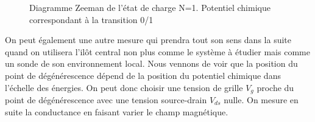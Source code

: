 \begin{figure}
\caption{Diagramme Zeeman de l'état de charge N=1. Potentiel chimique correspondant à la transition 0/1}
\label{charge_discharge}
\end{figure}

On peut également une autre mesure qui prendra tout son sens dans la suite quand on utilisera l'il\^ot central non plus comme le système à étudier mais comme un sonde de son environnement local. Nous vennons de voir que la position du point de dégénérescence dépend de la position du potentiel chimique dans l'échelle des énergies. On peut donc choisir une tension de grille $V_g$ proche du point de dégénérescence avec une tension source-drain $V_{ds}$ nulle. On mesure en suite la conductance en faisant varier le champ magnétique.